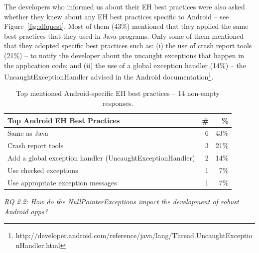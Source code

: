 The developers who informed us about their EH best practices were also asked whether they knew about any EH best practices specific to Android -- see Figure~\ref{fig:allquest}. Most of them (43\%) mentioned that they applied the same best practices that they used in Java programs. Only some of them mentioned that they adopted specific best practices such as: (i) the use of crash report tools (21\%) -- to notify the developer about the uncaught exceptions that happen in the application code; and (ii) the use of a global exception handler (14\%) -- the UncaughtExceptionHandler advised in the Android documentation\footnote{http://developer.android.com/reference/java/lang/Thread.UncaughtExceptionHandler.html}.					
									
\begin{table}
\scriptsize
\centering
\begin{tabular}{lrr}
\hline
\bfseries{Top Android EH Best Practices } & \bfseries{\#} & \bfseries{\%} \\
\hline
Same as Java	& 6 &	43\% \\
Crash report tools	 & 3 &	21\% \\
Add a global exception handler (UncaughtExceptionHandler)	 & 2 & 14\% \\
Use checked exceptions	& 1 &	7\% \\
Use appropriate exception messages	& 1 &	7\% \\
\hline
\end{tabular}
\caption{Top mentioned Android-specific EH best practices -- 14 non-empty responses. }
\label{tab:androidpractices}
\end{table}			

\bigskip




\bigskip

\noindent\emph{RQ 2.2: How do the NullPointerExceptions impact the development of robust Android apps?}


